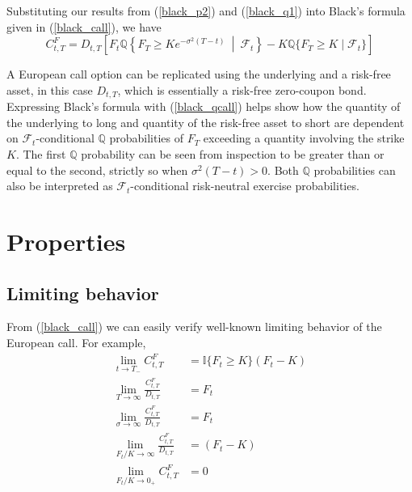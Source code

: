 \documentclass{article}
\numberwithin{equation}{section}
\begin{document}
Substituting our results from (\ref{black_p2}) and (\ref{black_q1}) into Black's
formula given in (\ref{black_call}), we have
\begin{equation} \label{black_qcall}
    C_{t, T}^F = D_{t, T}\left[F_t\mathbb{Q}\left\{F_T \ge Ke^{-\sigma^2(T - t)}
    \ \middle\vert \ \mathcal{F}_t\right\} -
    K\mathbb{Q}\{F_T \ge K \mid \mathcal{F}_t\}\right]
\end{equation}

A European call option can be replicated using the underlying and a risk-free
asset, in this case $ D_{t, T} $, which is essentially a
risk-free zero-coupon bond. Expressing Black's formula with (\ref{black_qcall})
helps show how the quantity of the underlying to long and quantity of the
risk-free asset to short are dependent on $ \mathcal{F}_t $-conditional
$ \mathbb{Q} $ probabilities of $ F_T $ exceeding a quantity involving the
strike $ K $. The first $ \mathbb{Q} $ probability can be seen from inspection
to be greater than or equal to the second, strictly so when
$ \sigma^2(T - t) > 0 $. Both $ \mathbb{Q} $ probabilities can also be
interpreted as $ \mathcal{F}_t $-conditional risk-neutral exercise
probabilities.

\section{Properties}

\subsection{Limiting behavior}

From (\ref{black_call}) we can easily verify well-known limiting behavior of
the European call. For example\footnotemark{},
\begin{equation} \label{black_limits}
    \begin{split}
        \lim_{t \rightarrow T_-}C_{t, T}^F & =
        \mathbb{I}\{F_t \ge K\}(F_t - K) \\
        \lim_{T \rightarrow \infty}\frac{C_{t, T}^F}{D_{t, T}} & = F_t \\
        \lim_{\sigma \rightarrow \infty}\frac{C_{t, T}^F}{D_{t, T}} & = F_t \\
        \lim_{F_t / K \rightarrow \infty}\frac{C_{t, T}^F}{D_{t, T}} & =
        (F_t - K) \\
        \lim_{F_t / K \rightarrow 0_+}C_{t, T}^F & = 0
    \end{split}
\end{equation}
\end{document}
